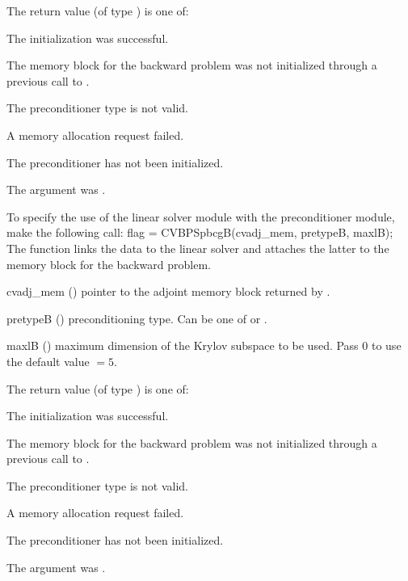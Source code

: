 {
  The return value  (of type ) is one of:
  \begin{args}
  \item[\Id{CVSPILS\_SUCCESS}]
    The {\cvspgmr} initialization was successful.
  \item[\Id{CVSPILS\_MEM\_NULL}]
    The {\cvodes} memory block for the backward problem was not initialized through a 
    previous call to .
  \item[\Id{CVSPILS\_ILL\_INPUT}]
    The preconditioner type  is not valid.
  \item[\Id{CVSPILS\_MEM\_FAIL}]
    A memory allocation request failed.
  \item[\Id{CVBANDPRE\_PDATA\_NULL}]
    The {\cvbandpre} preconditioner has not been initialized.
  \item[\Id{CVBANDPRE\_ADJMEM\_NULL}]
    The  argument was .
  \end{args}
}
{}
To specify the use of the {\cvspbcg} linear solver module with the {\cvbandpre} 
preconditioner module, make the following call:
{
  flag = CVBPSpbcgB(cvadj\_mem, pretypeB, maxlB);
}
{
  The function  links the {\cvbandpre} data to the
  {\cvspbcg} linear solver and attaches the latter to the {\cvodes}
  memory block for the backward problem.
}
{
  \begin{args}
  \item[cvadj\_mem] ()
    pointer to the adjoint memory block returned by .
  \item[pretypeB] ()
    preconditioning type. Can be one of  or .
  \item[maxlB] ()
    maximum dimension of the Krylov subspace to be used. Pass $0$ to use the 
    default value $=5$.
  \end{args}
}
{
  The return value  (of type ) is one of:
  \begin{args}
  \item[\Id{CVSPILS\_SUCCESS}]
    The {\cvspbcg} initialization was successful.
  \item[\Id{CVSPILS\_MEM\_NULL}]
    The {\cvodes} memory block for the backward problem was not initialized through a 
    previous call to .
  \item[\Id{CVSPILS\_ILL\_INPUT}]
    The preconditioner type  is not valid.
  \item[\Id{CVSPILS\_MEM\_FAIL}]
    A memory allocation request failed.
  \item[\Id{CVBANDPRE\_PDATA\_NULL}]
    The {\cvbandpre} preconditioner has not been initialized.
  \item[\Id{CVBANDPRE\_ADJMEM\_NULL}]
    The  argument was .
  \end{args}
}

